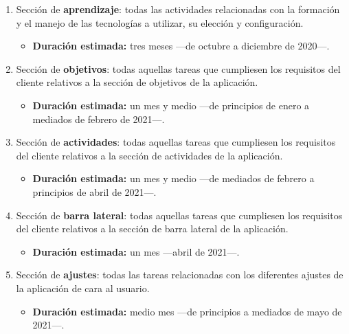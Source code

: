 \documentclass[10pt, a4paper]{aqademic}
\begin{document}
\begin{enumerate}
	\item Sección de \textbf{aprendizaje}: todas las actividades relacionadas con la formación y el manejo de las tecnologías a utilizar, su elección y configuración.
	
	\begin{itemize}
		\item \textbf{Duración estimada:} tres meses ---de octubre a diciembre de 2020---.
	\end{itemize}
	
	\item Sección de \textbf{objetivos}: todas aquellas tareas que cumpliesen los requisitos del cliente relativos a la sección de objetivos de la aplicación.
	
	\begin{itemize}
		\item \textbf{Duración estimada:} un mes y medio ---de principios de enero a mediados de febrero de 2021---.
	\end{itemize}
	
	\item Sección de \textbf{actividades}: todas aquellas tareas que cumpliesen los requisitos del cliente relativos a la sección de actividades de la aplicación.
	
	\begin{itemize}
		\item \textbf{Duración estimada:} un mes y medio ---de mediados de febrero a principios de abril de 2021---.
	\end{itemize}

	\item Sección de \textbf{barra lateral}: todas aquellas tareas que cumpliesen los requisitos del cliente relativos a la sección de barra lateral de la aplicación.
	
	\begin{itemize}
		\item \textbf{Duración estimada:} un mes ---abril de 2021---.
	\end{itemize}

	\item Sección de \textbf{ajustes}: todas las tareas relacionadas con los diferentes ajustes de la aplicación de cara al usuario.
	
	\begin{itemize}
		\item \textbf{Duración estimada:} medio mes ---de principios a mediados de mayo de 2021---.
	\end{itemize}
\end{enumerate}
\end{document}
